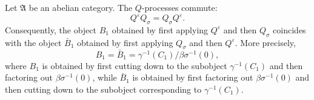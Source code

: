 \begin{theorem}[Theorem 4.1]
Let $\mathfrak{A}$ be an abelian category. The $Q$-processes commute:
\[
Q^{\varepsilon} Q_{\sigma} = Q_{\sigma} Q^{\varepsilon}.
\]
Consequently, the object $B_1$ obtained by first applying $Q^{\varepsilon}$ and then $Q_{\sigma}$ coincides with the object $\bar{B}_1$ obtained by first applying $Q_{\sigma}$ and then $Q^{\varepsilon}$. More precisely,
\[
B_1 = \bar{B}_1 = \gamma^{-1}(C_1) / \beta\sigma^{-1}(0),
\]
where $B_1$ is obtained by first cutting down to the subobject $\gamma^{-1}(C_1)$ and then factoring out $\beta\sigma^{-1}(0)$, while $\bar{B}_1$ is obtained by first factoring out $\beta\sigma^{-1}(0)$ and then cutting down to the subobject corresponding to $\gamma^{-1}(C_1)$.
\end{theorem}
